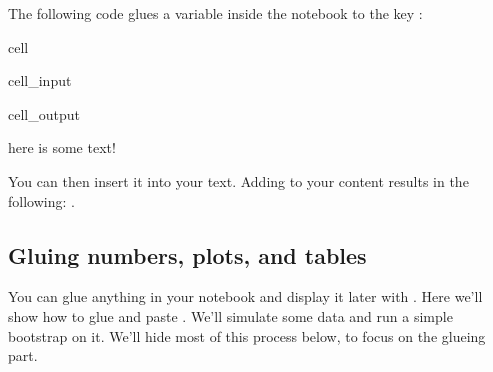 \documentclass[letterpaper,10pt,english]{jupyterBook}
\begin{document}
\sphinxAtStartPar
The following code glues a variable inside the notebook to the key :

\begin{sphinxuseclass}{cell}\begin{sphinxVerbatimInput}

\begin{sphinxuseclass}{cell_input}
\begin{sphinxVerbatim}[commandchars=\\\{\}]
   
  
 
\end{sphinxVerbatim}

\end{sphinxuseclass}\end{sphinxVerbatimInput}
\begin{sphinxVerbatimOutput}

\begin{sphinxuseclass}{cell_output}
\begin{sphinxVerbatim}[commandchars=\\\{\}]
\PYGZsq{}here is some text!\PYGZsq{}
\end{sphinxVerbatim}

\end{sphinxuseclass}\end{sphinxVerbatimOutput}

\end{sphinxuseclass}
\sphinxAtStartPar
You can then insert it into your text. Adding
 to your content results in the
following: .


\subsection{Gluing numbers, plots, and tables}
\label{\detokenize{overview:gluing-numbers-plots-and-tables}}
\sphinxAtStartPar
You can glue anything in your notebook and display it later with . Here
we’ll show how to glue and paste . We’ll simulate some
data and run a simple bootstrap on it. We’ll hide most of this process below,
to focus on the glueing part.
\end{document}
